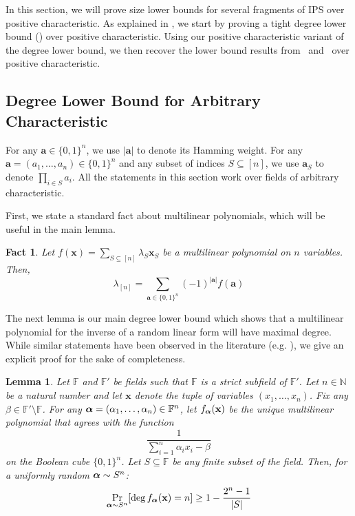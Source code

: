 \documentclass[11pt]{article}
\newtheorem{lemma}[theorem]{Lemma}
\newtheorem{fact}[theorem]{Fact}
\newcommand{\Boo}{\{0,1 \}}
\newcommand{\F}{\mathbb{F}}
\begin{document}
In this section, we will prove size lower bounds for several fragments of IPS over positive characteristic. As explained in , we start by proving a tight degree lower bound () over positive characteristic. Using our positive characteristic variant of the degree lower bound, we then recover the lower bound results from~\cite{FSTW21} and~\cite{GHT} over positive characteristic. 


\subsection{Degree Lower Bound for Arbitrary Characteristic}

For any $\mathbf{a} \in \Boo^n$, we use $|\mathbf{a}|$ to denote its Hamming weight.
For any $\mathbf{a} = (a_1, \dots, a_n) \in \Boo^n$ and any subset of indices $S\subseteq [n]$, we use $\mathbf{a}_S$ to denote $\prod_{i\in S}a_i$.
All the statements in this section work over fields of arbitrary characteristic. 

First, we state a standard fact about multilinear polynomials, which will be useful in the main lemma.
\begin{fact}\label{lem:top coeff of multilinear poly}
    Let $f(\mathbf{x}) = \sum_{S\subseteq [n]} \lambda_S \mathbf{x}_S$ be a multilinear polynomial on $n$ variables. Then, $$\lambda_{[n]} = \sum_{\mathbf{a}\in\Boo^n} (-1)^{|\mathbf{a}|}f(\mathbf{a})$$
\end{fact}


The next lemma is our main degree lower bound which shows that a multilinear polynomial for the inverse of a random linear form will have maximal degree. While similar statements have been observed in the literature (e.g. \cite[Proposition 2]{Grigoriev98}), we give an explicit proof for the sake of completeness.

\begin{lemma} \label{lem:basic degree lower bound}
    Let $\F$ and $\F'$ be fields such that $\F$ is a strict subfield of $\F'$. Let $n\in \mathbb{N}$ be a natural number and let $\mathbf{x}$ denote the tuple of variables $(x_1, \dots, x_n)$. Fix any $\beta \in \F'\setminus \F$. For any $\bfalpha = (\alpha_1, \dots, \alpha_n) \in \F^n$, let $f_{\boldsymbol{\alpha}}(\mathbf{x})$ be the unique multilinear polynomial that agrees with the function $$\frac{1}{\sum_{i=1}^n{\alpha_ix_i}-\beta}$$ on the Boolean cube $\Boo^n$.
    Let $S \subseteq \F$ be any finite subset of the field.
    Then, for a uniformly random $\boldsymbol{\alpha} \sim S^n$: $$\Pr_{\boldsymbol{\alpha} \sim S^n}[\deg{f_{\ensuremath{\boldsymbol{\alpha}}}(\mathbf{x})} = n] \geq 1 - \frac{2^n - 1}{|S|}$$
\end{lemma}
\end{document}
